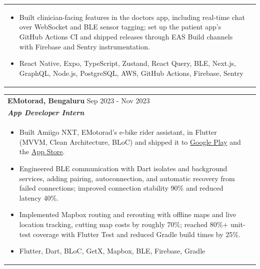 \documentclass[a4paper,8pt]{article}
\begin{document}
\begin{tabularx}{\linewidth}{ @{}l r@{} }
\begin{minipage}[t]{\linewidth}
\begin{itemize}[nosep,after=\strut, leftmargin=2em, itemsep=2pt]
        \item Built clinician-facing features in the doctors app, including real-time chat over WebSocket and BLE sensor tagging; set up the patient app's GitHub Actions CI and shipped releases through EAS Build channels with Firebase and Sentry instrumentation.
        \item React Native, Expo, TypeScript, Zustand, React Query, BLE, Next.js, GraphQL, Node.js, PostgreSQL, AWS, GitHub Actions, Firebase, Sentry
    \end{itemize}
\end{minipage}
\end{tabularx}

\begin{tabularx}{\linewidth}{ @{}l r@{} }
\color[HTML]{1C033C} \textbf{EMotorad, Bengaluru} \hfill \color[HTML]{371e77} Sep 2023 - Nov 2023 \\[4pt]
\color[HTML]{371e77}\textbf{\textit{App Developer Intern}} \hfill \color[HTML]{4B28A4} \\[5pt]
\begin{minipage}[t]{\linewidth}
    \begin{itemize}[nosep,after=\strut, leftmargin=2em, itemsep=2pt]
        \item Built Amiigo NXT, EMotorad's e-bike rider assistant, in Flutter (MVVM, Clean Architecture, BLoC) and shipped it to \href{https://play.google.com/store/apps/details?id=com.emotorad.amigonxt}{Google Play} and the \href{https://apps.apple.com/in/app/amiigo-nxt/id6737222680}{App Store}.
        \item Engineered BLE communication with Dart isolates and background services, adding pairing, autoconnection, and automatic recovery from failed connections; improved connection stability 90\% and reduced latency 40\%.
        \item Implemented Mapbox routing and rerouting with offline maps and live location tracking, cutting map costs by roughly 70\%; reached 80\%+ unit-test coverage with Flutter Test and reduced Gradle build times by 25\%.
        \item Flutter, Dart, BLoC, GetX, Mapbox, BLE, Firebase, Gradle
    \end{itemize}
    \end{minipage}
\end{tabularx}\\[3pt]

\end{document}
